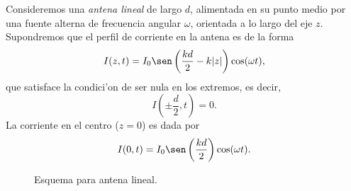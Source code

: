 Consideremos una \textit{antena lineal} de largo $d$, alimentada en su punto medio por una fuente alterna de frecuencia angular $\omega$, orientada a lo largo del eje $z$. Supondremos que el perfil de corriente en la antena es de la forma
\begin{equation}
 I(z,t)=I_0\sen\left(\frac{kd}{2}-k|z|\right)\cos(\omega t),
\end{equation}
que satisface la condici'on de ser nula en los extremos, es decir,
\begin{equation}
 I\left(\pm \frac{d}{2},t\right)=0.
\end{equation}
La corriente en el centro ($z=0$) es dada por
\begin{equation}
 I(0,t)=I_0\sen\left(\frac{kd}{2}\right)\cos(\omega t).
\end{equation}

\begin{figure}[H]
\centerline{}
 \caption{Esquema para antena lineal.}
\label{fig:antena}
\end{figure}

